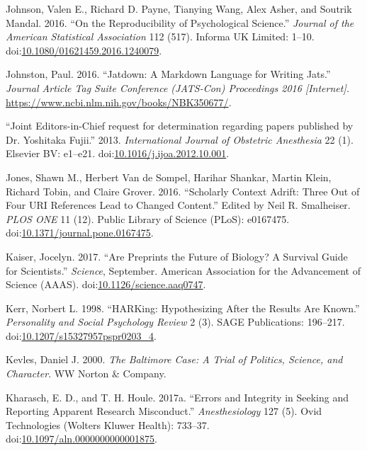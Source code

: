 \documentclass[a5paper]{book}
\begin{document}
\hypertarget{ref-doi:10.1080ux2f01621459.2016.1240079}{}
Johnson, Valen E., Richard D. Payne, Tianying Wang, Alex Asher, and
Soutrik Mandal. 2016. ``On the Reproducibility of Psychological
Science.'' \emph{Journal of the American Statistical Association} 112
(517). Informa UK Limited: 1--10.
doi:\href{https://doi.org/10.1080/01621459.2016.1240079}{10.1080/01621459.2016.1240079}.

\hypertarget{ref-jatdown}{}
Johnston, Paul. 2016. ``Jatdown: A Markdown Language for Writing Jats.''
\emph{Journal Article Tag Suite Conference (JATS-Con) Proceedings 2016
{[}Internet{]}.} \url{https://www.ncbi.nlm.nih.gov/books/NBK350677/}.

\hypertarget{ref-doi:10.1016ux2fj.ijoa.2012.10.001}{}
``Joint Editors-in-Chief request for determination regarding papers
published by Dr. Yoshitaka Fujii.'' 2013. \emph{International Journal of
Obstetric Anesthesia} 22 (1). Elsevier BV: e1--e21.
doi:\href{https://doi.org/10.1016/j.ijoa.2012.10.001}{10.1016/j.ijoa.2012.10.001}.

\hypertarget{ref-doi:10.1371ux2fjournal.pone.0167475}{}
Jones, Shawn M., Herbert Van de Sompel, Harihar Shankar, Martin Klein,
Richard Tobin, and Claire Grover. 2016. ``Scholarly Context Adrift:
Three Out of Four URI References Lead to Changed Content.'' Edited by
Neil R. Smalheiser. \emph{PLOS ONE} 11 (12). Public Library of Science
(PLoS): e0167475.
doi:\href{https://doi.org/10.1371/journal.pone.0167475}{10.1371/journal.pone.0167475}.

\hypertarget{ref-doi:10.1126ux2fscience.aaq0747}{}
Kaiser, Jocelyn. 2017. ``Are Preprints the Future of Biology? A Survival
Guide for Scientists.'' \emph{Science}, September. American Association
for the Advancement of Science (AAAS).
doi:\href{https://doi.org/10.1126/science.aaq0747}{10.1126/science.aaq0747}.

\hypertarget{ref-doi:10.1207ux2fs15327957pspr0203_4}{}
Kerr, Norbert L. 1998. ``HARKing: Hypothesizing After the Results Are
Known.'' \emph{Personality and Social Psychology Review} 2 (3). SAGE
Publications: 196--217.
doi:\href{https://doi.org/10.1207/s15327957pspr0203_4}{10.1207/s15327957pspr0203\_4}.

\hypertarget{ref-isbn:9780393319705}{}
Kevles, Daniel J. 2000. \emph{The Baltimore Case: A Trial of Politics,
Science, and Character}. WW Norton \& Company.

\hypertarget{ref-doi:10.1097ux2faln.0000000000001875}{}
Kharasch, E. D., and T. H. Houle. 2017a. ``Errors and Integrity in
Seeking and Reporting Apparent Research Misconduct.''
\emph{Anesthesiology} 127 (5). Ovid Technologies (Wolters Kluwer
Health): 733--37.
doi:\href{https://doi.org/10.1097/aln.0000000000001875}{10.1097/aln.0000000000001875}.
\end{document}
